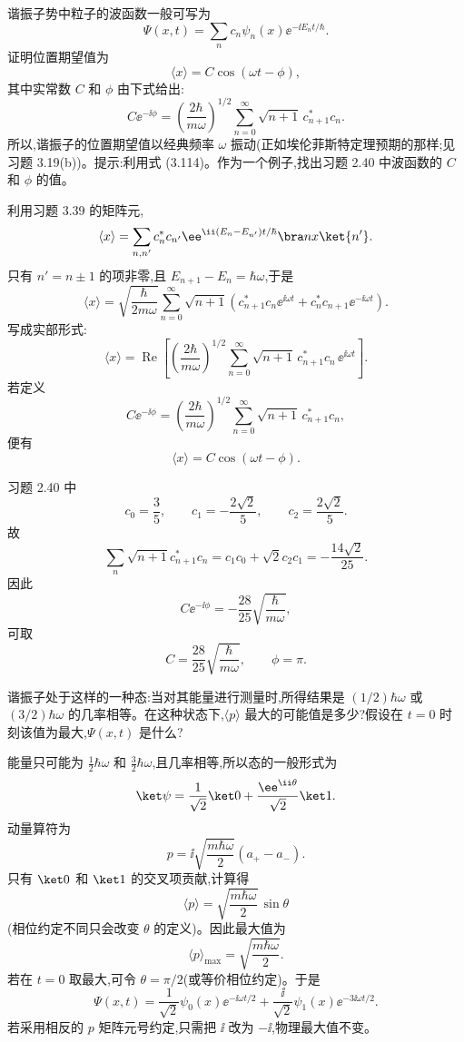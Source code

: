 \begin{question}
谐振子势中粒子的波函数一般可写为
\[
\Psi(x,t)=\sum_n c_n\psi_n(x)\mathrm \ee^{-\ii E_nt/\hbar}.
\]
证明位置期望值为
\[
\langle x\rangle=C\cos(\omega t-\phi),
\]
其中实常数 $C$ 和 $\phi$ 由下式给出:
\[
C\ee^{-\ii\phi}=\left(\frac{2\hbar}{m\omega}\right)^{1/2}
\sum_{n=0}^{\infty}\sqrt{n+1}\,c_{n+1}^*c_n.
\]
所以,谐振子的位置期望值以经典频率 $\omega$ 振动(正如埃伦菲斯特定理预期的那样;见习题 3.19(b))。提示:利用式 (3.114)。作为一个例子,找出习题 2.40 中波函数的 $C$ 和 $\phi$ 的值。

\par\smallskip
{}

\begin{solution}
利用习题 3.39 的矩阵元,
\[
\langle x\rangle
=\sum_{n,n'}c_n^*c_{n'}\ee^{\ii(E_n-E_{n'})t/\hbar}\bra n x\ket{n'}.
\]
只有 $n'=n\pm1$ 的项非零,且 $E_{n+1}-E_n=\hbar\omega$,于是
\[
\langle x\rangle=\sqrt{\frac{\hbar}{2m\omega}}
\sum_{n=0}^{\infty}\sqrt{n+1}
\left(c_{n+1}^*c_n\ee^{\ii\omega t}+c_n^*c_{n+1}\ee^{-\ii\omega t}\right).
\]
写成实部形式:
\[
\langle x\rangle=\operatorname{Re}\left[
\left(\frac{2\hbar}{m\omega}\right)^{1/2}
\sum_{n=0}^{\infty}\sqrt{n+1}\,c_{n+1}^*c_n\,\ee^{\ii\omega t}\right].
\]
若定义
\[
C\ee^{-\ii\phi}=\left(\frac{2\hbar}{m\omega}\right)^{1/2}
\sum_{n=0}^{\infty}\sqrt{n+1}\,c_{n+1}^*c_n,
\]
便有
\[
\boxed{\langle x\rangle=C\cos(\omega t-\phi).}
\]

习题 2.40 中
\[
c_0=\frac35,
\qquad c_1=-\frac{2\sqrt2}{5},
\qquad c_2=\frac{2\sqrt2}{5}.
\]
故
\[
\sum_n\sqrt{n+1}c_{n+1}^*c_n
=c_1c_0+\sqrt2c_2c_1
=-\frac{14\sqrt2}{25}.
\]
因此
\[
C\ee^{-\ii\phi}=-\frac{28}{25}\sqrt{\frac{\hbar}{m\omega}},
\]
可取
\[
\boxed{C=\frac{28}{25}\sqrt{\frac{\hbar}{m\omega}},\qquad \phi=\pi.}
\]
\end{solution}
\end{question}

\begin{question}
谐振子处于这样的一种态:当对其能量进行测量时,所得结果是 $(1/2)\hbar\omega$ 或 $(3/2)\hbar\omega$ 的几率相等。在这种状态下,$\langle p\rangle$ 最大的可能值是多少?假设在 $t=0$ 时刻该值为最大,$\Psi(x,t)$ 是什么?
\begin{solution}
能量只可能为 $\frac12\hbar\omega$ 和 $\frac32\hbar\omega$,且几率相等,所以态的一般形式为
\[
\ket\psi=\frac1{\sqrt2}\ket0+\frac{\ee^{\ii\theta}}{\sqrt2}\ket1.
\]
动量算符为
\[
p=\ii\sqrt{\frac{m\hbar\omega}{2}}(a_+-a_-).
\]
只有 $\ket0$ 和 $\ket1$ 的交叉项贡献,计算得
\[
\langle p\rangle
=\sqrt{\frac{m\hbar\omega}{2}}\,\sin\theta
\]
(相位约定不同只会改变 $\theta$ 的定义)。因此最大值为
\[
\boxed{\langle p\rangle_{\max}=\sqrt{\frac{m\hbar\omega}{2}}.}
\]
若在 $t=0$ 取最大,可令 $\theta=\pi/2$(或等价相位约定)。于是
\[
\boxed{\Psi(x,t)=\frac1{\sqrt2}\psi_0(x)\ee^{-\ii\omega t/2}
+\frac{\ii}{\sqrt2}\psi_1(x)\ee^{-3\ii\omega t/2}.}
\]
若采用相反的 $p$ 矩阵元号约定,只需把 $\ii$ 改为 $-\ii$,物理最大值不变。
\end{solution}
\end{question}

